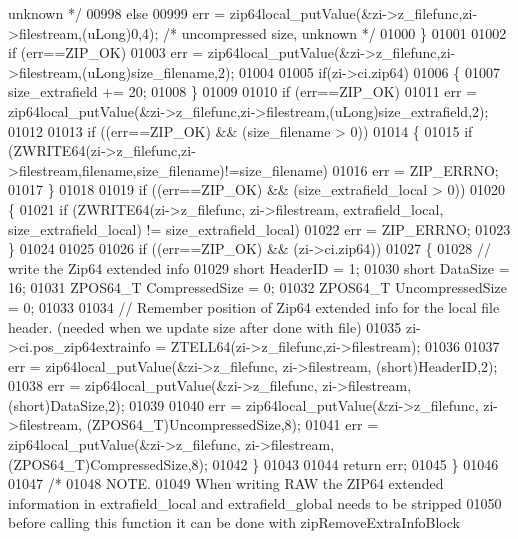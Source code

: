 \begin{DoxyCode}
{       unknown */}
00998     \textcolor{keywordflow}{else}
00999       err = zip64local\_putValue(&zi->z\_filefunc,zi->filestream,(uLong)0,4); \textcolor{comment}{/* uncompressed size, unknown 
      */}
01000   \}
01001 
01002   \textcolor{keywordflow}{if} (err==ZIP\_OK)
01003     err = zip64local\_putValue(&zi->z\_filefunc,zi->filestream,(uLong)size\_filename,2);
01004 
01005   \textcolor{keywordflow}{if}(zi->ci.zip64)
01006   \{
01007     size\_extrafield += 20;
01008   \}
01009 
01010   \textcolor{keywordflow}{if} (err==ZIP\_OK)
01011     err = zip64local\_putValue(&zi->z\_filefunc,zi->filestream,(uLong)size\_extrafield,2);
01012 
01013   \textcolor{keywordflow}{if} ((err==ZIP\_OK) && (size\_filename > 0))
01014   \{
01015     \textcolor{keywordflow}{if} (ZWRITE64(zi->z\_filefunc,zi->filestream,filename,size\_filename)!=size\_filename)
01016       err = ZIP\_ERRNO;
01017   \}
01018 
01019   \textcolor{keywordflow}{if} ((err==ZIP\_OK) && (size\_extrafield\_local > 0))
01020   \{
01021     \textcolor{keywordflow}{if} (ZWRITE64(zi->z\_filefunc, zi->filestream, extrafield\_local, size\_extrafield\_local) != 
      size\_extrafield\_local)
01022       err = ZIP\_ERRNO;
01023   \}
01024 
01025 
01026   \textcolor{keywordflow}{if} ((err==ZIP\_OK) && (zi->ci.zip64))
01027   \{
01028       \textcolor{comment}{// write the Zip64 extended info}
01029       \textcolor{keywordtype}{short} HeaderID = 1;
01030       \textcolor{keywordtype}{short} DataSize = 16;
01031       ZPOS64\_T CompressedSize = 0;
01032       ZPOS64\_T UncompressedSize = 0;
01033 
01034       \textcolor{comment}{// Remember position of Zip64 extended info for the local file header. (needed when we update size
       after done with file)}
01035       zi->ci.pos\_zip64extrainfo = ZTELL64(zi->z\_filefunc,zi->filestream);
01036 
01037       err = zip64local\_putValue(&zi->z\_filefunc, zi->filestream, (\textcolor{keywordtype}{short})HeaderID,2);
01038       err = zip64local\_putValue(&zi->z\_filefunc, zi->filestream, (\textcolor{keywordtype}{short})DataSize,2);
01039 
01040       err = zip64local\_putValue(&zi->z\_filefunc, zi->filestream, (ZPOS64\_T)UncompressedSize,8);
01041       err = zip64local\_putValue(&zi->z\_filefunc, zi->filestream, (ZPOS64\_T)CompressedSize,8);
01042   \}
01043 
01044   \textcolor{keywordflow}{return} err;
01045 \}
01046 
01047 \textcolor{comment}{/*}
01048 \textcolor{comment}{ NOTE.}
01049 \textcolor{comment}{ When writing RAW the ZIP64 extended information in extrafield\_local and extrafield\_global needs to be
       stripped}
01050 \textcolor{comment}{ before calling this function it can be done with zipRemoveExtraInfoBlock}

\end{DoxyCode}
